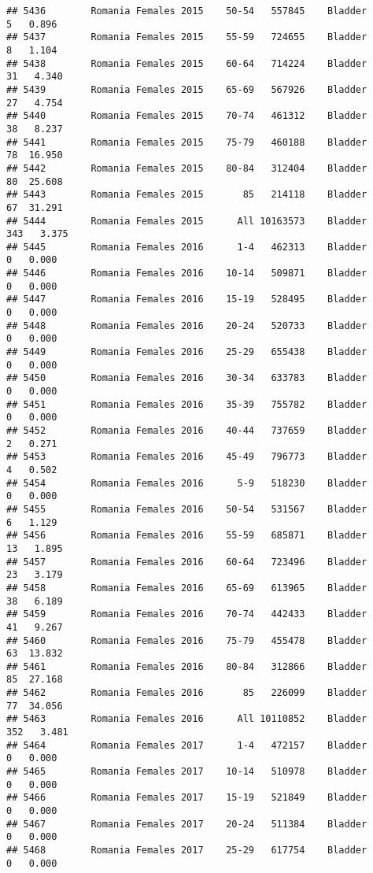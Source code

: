 \documentclass[
]{article}
\begin{document}
\begin{verbatim}
## 5436        Romania Females 2015    50-54   557845    Bladder      5   0.896
## 5437        Romania Females 2015    55-59   724655    Bladder      8   1.104
## 5438        Romania Females 2015    60-64   714224    Bladder     31   4.340
## 5439        Romania Females 2015    65-69   567926    Bladder     27   4.754
## 5440        Romania Females 2015    70-74   461312    Bladder     38   8.237
## 5441        Romania Females 2015    75-79   460188    Bladder     78  16.950
## 5442        Romania Females 2015    80-84   312404    Bladder     80  25.608
## 5443        Romania Females 2015       85   214118    Bladder     67  31.291
## 5444        Romania Females 2015      All 10163573    Bladder    343   3.375
## 5445        Romania Females 2016      1-4   462313    Bladder      0   0.000
## 5446        Romania Females 2016    10-14   509871    Bladder      0   0.000
## 5447        Romania Females 2016    15-19   528495    Bladder      0   0.000
## 5448        Romania Females 2016    20-24   520733    Bladder      0   0.000
## 5449        Romania Females 2016    25-29   655438    Bladder      0   0.000
## 5450        Romania Females 2016    30-34   633783    Bladder      0   0.000
## 5451        Romania Females 2016    35-39   755782    Bladder      0   0.000
## 5452        Romania Females 2016    40-44   737659    Bladder      2   0.271
## 5453        Romania Females 2016    45-49   796773    Bladder      4   0.502
## 5454        Romania Females 2016      5-9   518230    Bladder      0   0.000
## 5455        Romania Females 2016    50-54   531567    Bladder      6   1.129
## 5456        Romania Females 2016    55-59   685871    Bladder     13   1.895
## 5457        Romania Females 2016    60-64   723496    Bladder     23   3.179
## 5458        Romania Females 2016    65-69   613965    Bladder     38   6.189
## 5459        Romania Females 2016    70-74   442433    Bladder     41   9.267
## 5460        Romania Females 2016    75-79   455478    Bladder     63  13.832
## 5461        Romania Females 2016    80-84   312866    Bladder     85  27.168
## 5462        Romania Females 2016       85   226099    Bladder     77  34.056
## 5463        Romania Females 2016      All 10110852    Bladder    352   3.481
## 5464        Romania Females 2017      1-4   472157    Bladder      0   0.000
## 5465        Romania Females 2017    10-14   510978    Bladder      0   0.000
## 5466        Romania Females 2017    15-19   521849    Bladder      0   0.000
## 5467        Romania Females 2017    20-24   511384    Bladder      0   0.000
## 5468        Romania Females 2017    25-29   617754    Bladder      0   0.000

\end{verbatim}
\end{document}
